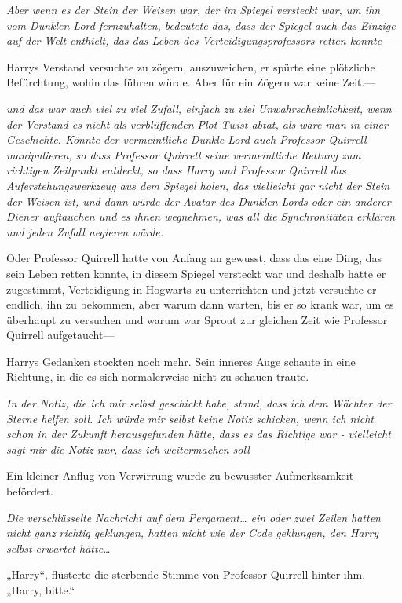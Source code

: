{\emph{Aber wenn es der Stein der Weisen war, der im Spiegel versteckt war, um ihn vom Dunklen Lord fernzuhalten, bedeutete das, dass der Spiegel auch das Einzige auf der Welt enthielt, das das Leben des Verteidigungsprofessors retten konnte}—

Harrys Verstand versuchte zu zögern, auszuweichen, er spürte eine plötzliche Befürchtung, wohin das führen würde. Aber für ein Zögern war keine Zeit.—

\emph{und das war auch viel zu viel Zufall, einfach zu viel Unwahrscheinlichkeit, wenn der Verstand es nicht als verblüffenden Plot Twist abtat, als wäre man in einer Geschichte. Könnte der vermeintliche Dunkle Lord auch Professor Quirrell manipulieren, so dass Professor Quirrell seine vermeintliche Rettung zum richtigen Zeitpunkt entdeckt, so dass Harry und Professor Quirrell das Auferstehungswerkzeug aus dem Spiegel holen, das vielleicht gar nicht der Stein der Weisen ist, und dann würde der Avatar des Dunklen Lords oder ein anderer Diener auftauchen und es ihnen wegnehmen, was all die Synchronitäten erklären und jeden Zufall negieren würde.}

Oder Professor Quirrell hatte von Anfang an gewusst, dass das eine Ding, das sein Leben retten konnte, in diesem Spiegel versteckt war und deshalb hatte er zugestimmt, Verteidigung in Hogwarts zu unterrichten und jetzt versuchte er endlich, ihn zu bekommen, aber warum dann warten, bis er so krank war, um es überhaupt zu versuchen und warum war Sprout zur gleichen Zeit wie Professor Quirrell aufgetaucht—

Harrys Gedanken stockten noch mehr. Sein inneres Auge schaute in eine Richtung, in die es sich normalerweise nicht zu schauen traute.

\emph{In der Notiz, die ich mir selbst geschickt habe, stand, dass ich dem Wächter der Sterne helfen soll. Ich würde mir selbst keine Notiz schicken, wenn ich nicht schon in der Zukunft herausgefunden hätte, dass es das Richtige war - vielleicht sagt mir die Notiz nur, dass ich weitermachen soll—}

Ein kleiner Anflug von Verwirrung wurde zu bewusster Aufmerksamkeit befördert.

\emph{Die verschlüsselte Nachricht auf dem Pergament… ein oder zwei Zeilen hatten nicht ganz richtig geklungen, hatten nicht wie der Code geklungen, den Harry selbst erwartet hätte…}

„Harry“, flüsterte die sterbende Stimme von Professor Quirrell hinter ihm. „Harry, bitte.“

}
